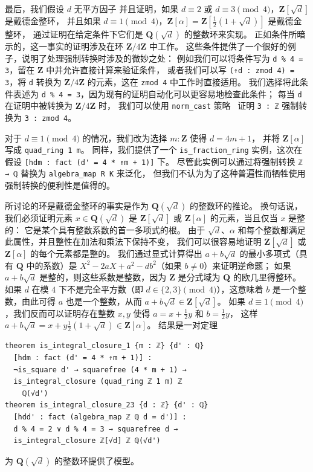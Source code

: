 \documentclass[sigplan,10pt,nonacm,
screen]{acmart} \settopmatter{printfolios=true,printccs=false,printacmref=false}
\newcommand{\QQ}{\mathbf{Q}}
\newcommand{\ZZ}{\mathbf{Z}}
\begin{document}
最后，我们假设 $d$ 无平方因子
并且证明，如果 $d \equiv 2$ 或 $d \equiv 3 \pmod 4$，$\ZZ[\sqrt{d}]$ 是戴德金整环，
并且如果 $d \equiv 1 \pmod 4$，$\ZZ[\alpha] = \ZZ[\frac{1}{2}(1 + \sqrt{d})]$ 是戴德金整环，
通过证明在给定条件下它们是 $\QQ(\sqrt d)$ 的整数环来实现。
正如条件所暗示的，这一事实的证明涉及在环 $\ZZ / 4\ZZ$ 中工作。
这些条件提供了一个很好的例子，说明了处理强制转换时涉及的微妙之处：
例如我们可以将条件写为 \lstinline{d % 4 = 3}，留在 $\ZZ$ 中并允许直接计算来验证条件，
或者我们可以写 \lstinline{(↑d : zmod 4) = 3}，将 \lstinline{d} 转换为 $\ZZ / 4\ZZ$ 的元素，这在 \lstinline{zmod 4} 中工作时直接适用。
我们选择将此条件表述为 \lstinline{d % 4 = 3}，因为现有的证明自动化可以更容易地检查此条件；
每当 \lstinline{d} 在证明中被转换为 $\ZZ / 4\ZZ$ 时，
我们可以使用 \lstinline{norm_cast} 策略~\cite{norm_cast} 证明 \lstinline{3 : ℤ} 强制转换为 \lstinline{3 : zmod 4}。

对于 $d \equiv 1 \pmod 4$ 的情况，我们改为选择 $m : \ZZ$ 使得 $d = 4m + 1$，
并将 $\ZZ[\alpha]$ 写成 \lstinline{quad_ring 1 m}。
同样，我们提供了一个 \lstinline{is_fraction_ring} 实例，这次在假设 \lstinline{[hdm : fact (d' = 4 * ↑m + 1)]} 下。
尽管此实例可以通过将强制转换 \lstinline{ℤ → ℚ} 替换为 \lstinline{algebra_map R K} 来泛化，
但我们不认为为了这种普遍性而牺牲使用强制转换的便利性是值得的。

所讨论的环是戴德金整环的事实是作为 $\QQ(\sqrt{d})$ 的整数环的推论。
换句话说，我们必须证明元素 $x \in \QQ(\sqrt{d})$ 是 $\ZZ[\sqrt{d}]$ 或 $\ZZ[\alpha]$ 的元素，当且仅当 $x$ 是整的：
它是某个具有整数系数的首一多项式的根。
由于 $\sqrt{d}$、$\alpha$ 和每个整数都满足此属性，并且整性在加法和乘法下保持不变，
我们可以很容易地证明 $\ZZ[\sqrt{d}]$ 或 $\ZZ[\alpha]$ 的每个元素都是整的。
我们通过显式计算得出 $a + b \sqrt{d}$ 的最小多项式（具有 $\QQ$ 中的系数）是 $X^2 - 2aX + a^2 - d b^2$（如果 $b \ne 0$）来证明逆命题；
如果 $a + b \sqrt{d}$ 是整的，则这些系数是整数，因为 $\ZZ$ 是分式域为 $\QQ$ 的欧几里得整环。
如果 $d$ 在模 $4$ 下不是完全平方数（即 $d \in \{2, 3\} \pmod 4$），这意味着 $b$ 是一个整数，由此可得 $a$ 也是一个整数，从而 $a + b \sqrt{d} \in \ZZ[\sqrt{d}]$。
如果 $d \equiv 1 \pmod 4$，我们反而可以证明存在整数 $x, y$ 使得 $a = x + \frac{1}{2}y$ 和 $b = \frac{1}{2}y$，
这样 $a + b \sqrt{d} = x + y\frac{1}{2}(1 + \sqrt{d}) \in \ZZ[\alpha]$。
结果是一对定理
\begin{lstlisting}
theorem is_integral_closure_1 {m : ℤ} {d' : ℚ}
  [hdm : fact (d' = 4 * ↑m + 1)] :
  ¬is_square d' → squarefree (4 * m + 1) →
  is_integral_closure (quad_ring ℤ 1 m) ℤ
    ℚ(√d')
theorem is_integral_closure_23 {d : ℤ} {d' : ℚ}
  [hdd' : fact (algebra_map ℤ ℚ d = d')] :
  d % 4 = 2 ∨ d % 4 = 3 → squarefree d →
  is_integral_closure ℤ[√d] ℤ ℚ(√d')
\end{lstlisting}
为 $\QQ(\sqrt d)$ 的整数环提供了模型。
\end{document}
